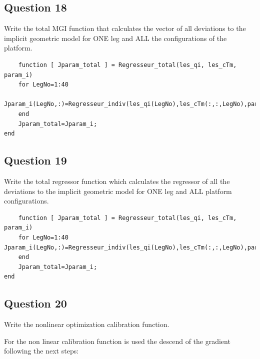 \documentclass[12pt, twoside]{report}
\begin{document}
\subsection{Question 18}
 Write the total MGI function that calculates the vector of all deviations to the implicit
geometric model for ONE leg and ALL the configurations of the platform.
\begin{lstlisting}
    function [ Jparam_total ] = Regresseur_total(les_qi, les_cTm, param_i)
    for LegNo=1:40
        Jparam_i(LegNo,:)=Regresseur_indiv(les_qi(LegNo),les_cTm(:,:,LegNo),param_i);
    end
    Jparam_total=Jparam_i;
end
\end{lstlisting}

\subsection{Question 19}
Write the total regressor function which calculates the regressor of all the deviations
to the implicit geometric model for ONE leg and ALL platform configurations.
\begin{lstlisting}
    function [ Jparam_total ] = Regresseur_total(les_qi, les_cTm, param_i)
    for LegNo=1:40 Jparam_i(LegNo,:)=Regresseur_indiv(les_qi(LegNo),les_cTm(:,:,LegNo),param_i);
    end
    Jparam_total=Jparam_i;
end
\end{lstlisting}



\subsection{Question 20}
Write the nonlinear optimization calibration function.


For the non linear calibration function is used the descend of the gradient following the next steps:
\end{document}
